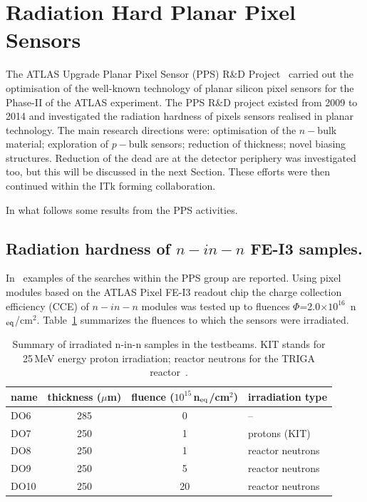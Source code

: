 \section{Radiation Hard Planar Pixel Sensors}
\label{sec:radhardpixels}

The ATLAS Upgrade Planar Pixel Sensor (PPS) R\&D Project~\cite{PPS:proj} carried out the optimisation of the 
well-known technology of planar silicon pixel sensors for the Phase-II of the ATLAS experiment. 
The PPS R\&D project existed from 2009 to 2014 and investigated the radiation hardness of 
pixels sensors realised in planar technology. The main research directions were: optimisation 
of the $n-$bulk material; exploration of $p-$bulk sensors; reduction of thickness; novel biasing 
structures.  
Reduction of the dead are at the detector periphery was investigated too, but this will be discussed in the 
next Section. 
These efforts were then continued within the ITk forming collaboration. 

In what follows some results from the PPS activities.

\subsection{Radiation hardness of $n-in-n$ FE-I3 samples.}
In~\cite{BOMBEN2012940,1748-0221-7-10-P10028} examples of the searches within the PPS group 
are reported. Using pixel modules based on the ATLAS Pixel FE-I3 readout chip the charge collection 
efficiency (CCE) of $n-in-n$ modules was tested up to fluences 
$\Phi$=2.0$\times10^{16}$~n$_{\rm eq}$/cm$^2$. Table~\ref{tab:n-in-n} summarizes the fluences to which 
the sensors were irradiated.

\begin{table}[!htb]
\caption{\label{tab:n-in-n}Summary of irradiated n-in-n samples in the testbeams. KIT stands for 25\,MeV energy proton irradiation; reactor neutrons for the TRIGA reactor~\cite{SNOJ2011136}.
}
\begin{center}
\begin{tabular}{l|c|c|l}
name & thickness ($\mu$m)  & fluence ($10^{15}$\,n$_{\rm eq}$/cm$^2$) & irradiation type\\
\hline \hline
DO6 & 285 & 0 & -- \\
DO7 & 250 & 1 & protons (KIT)  \\
DO8 & 250 & 1 & reactor neutrons  \\
DO9 & 250 & 5 & reactor neutrons \\
DO10 & 250 & 20 & reactor neutrons \\
\hline
\end{tabular}
\end{center}
\end{table} 

